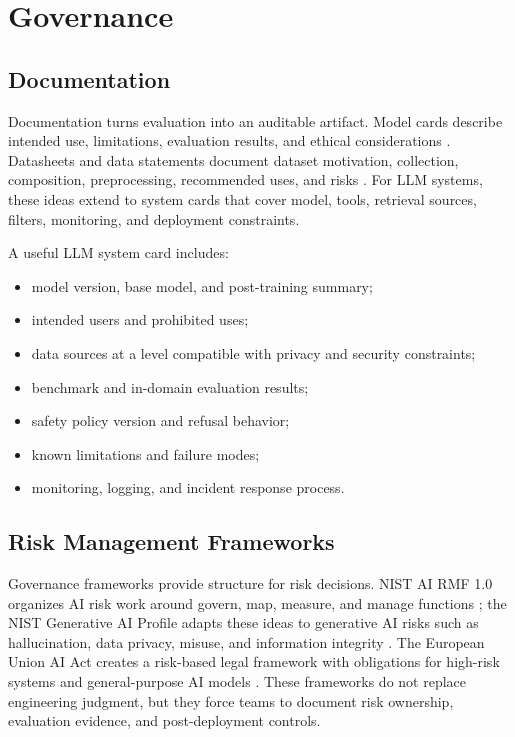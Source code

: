 \section{Governance}
\subsection{Documentation}
Documentation turns evaluation into an auditable artifact. Model cards describe intended use, limitations, evaluation results, and ethical considerations \cite{mitchell2019model}. Datasheets and data statements document dataset motivation, collection, composition, preprocessing, recommended uses, and risks \cite{gebru2021datasheets,bender2018data}. For LLM systems, these ideas extend to system cards that cover model, tools, retrieval sources, filters, monitoring, and deployment constraints.

A useful LLM system card includes:
\begin{itemize}
    \item model version, base model, and post-training summary;
    \item intended users and prohibited uses;
    \item data sources at a level compatible with privacy and security constraints;
    \item benchmark and in-domain evaluation results;
    \item safety policy version and refusal behavior;
    \item known limitations and failure modes;
    \item monitoring, logging, and incident response process.
\end{itemize}

\subsection{Risk Management Frameworks}
Governance frameworks provide structure for risk decisions. NIST AI RMF 1.0 organizes AI risk work around govern, map, measure, and manage functions \cite{nist2023airmf}; the NIST Generative AI Profile adapts these ideas to generative AI risks such as hallucination, data privacy, misuse, and information integrity \cite{nist2024genai}. The European Union AI Act creates a risk-based legal framework with obligations for high-risk systems and general-purpose AI models \cite{europeanunion2024aiact}. These frameworks do not replace engineering judgment, but they force teams to document risk ownership, evaluation evidence, and post-deployment controls.


